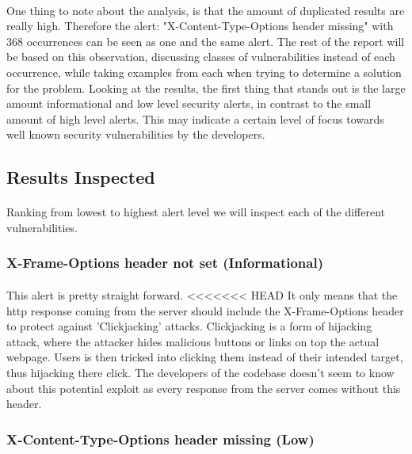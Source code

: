 \documentclass[11pt,english,a4paper]{report}
\begin{document}
\paragraph{}
One thing to note about the analysis, is that the amount of duplicated results are really high. 
Therefore the alert: "X-Content-Type-Options header missing" with 368 occurrences can be seen as one and the same alert. 
The rest of the report will be based on this observation, discussing classes of vulnerabilities instead of each occurrence, while taking examples from each when trying to determine a solution for the problem.
Looking at the results, the first thing that stands out is the large amount informational and low level security alerts, in contrast to the small amount of high level alerts.
This may indicate a certain level of focus towards well known security vulnerabilities by the developers.

\subsection{Results Inspected}
\paragraph{}
Ranking from lowest to highest alert level we will inspect each of the different vulnerabilities.

\subsubsection{X-Frame-Options header not set (Informational)}
\paragraph{}
This alert is pretty straight forward.
<<<<<<< HEAD
It only means that the \gls{http} response coming from the server should include the X-Frame-Options header to protect against 'Clickjacking'\cite{clickjacking} attacks.
Clickjacking is a form of hijacking attack, where the attacker hides malicious buttons or links on top the actual webpage.
Users is then tricked into clicking them instead of their intended target, thus hijacking there click.
The developers of the codebase doesn't seem to know about this potential exploit as every response from the server comes without this header.

\subsubsection{X-Content-Type-Options header missing (Low)}
\end{document}
